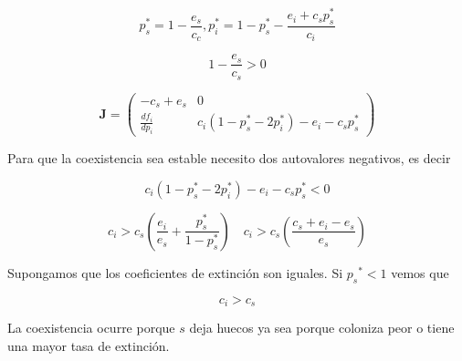 \documentclass[twocolumn,aps,prl]{revtex4-1}
\begin{document}
$$
p_{s}^{*}=1-\frac{e_{s}}{c_{c}}, p_{i}^{*}=1-p_{s}^{*}-\frac{e_{i}+c_{s} p_{s}^{*}}{c_{i}}
$$

$$
1 - \frac{e_{s}}{c_{s}} > 0
$$

\begin{equation}
    \mathbf{J}=\left(
    \begin{array}{cc}
        -c_{s}+e_{s} & 0 \\
        \frac{d f_{i}}{d p_{i}} & c_{i}\left(1-p_{s}^{*}-2 p_{i}^{*}\right)-e_{i}-c_{s} p_{s}^{*}
    \end{array}
    \right)
\end{equation}

Para que la coexistencia sea estable necesito dos autovalores negativos, es decir

$$
c_{i}\left(1-p_{s}^{*}-2 p_{i}^{*}\right)-e_{i}-c_{s} p_{s}^{*}<0
$$

$$
c_{i}>c_{s}\left(\frac{e_{i}}{e_{s}}+\frac{p_{s}^{*}}{1-p_{s}^{*}}\right) \quad c_{i}>c_{s}\left(\frac{c_{s}+e_{i}-e_{s}}{e_{s}}\right)
$$

Supongamos que los coeficientes de extinción son iguales. Si $p_{s}{ }^{*}<1$ vemos que

$$
c_{i}>c_{s}
$$

La coexistencia ocurre porque $s$ deja huecos ya sea porque coloniza peor o tiene una mayor tasa de extinción.

% 
\end{document}
